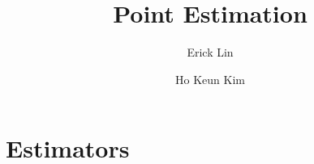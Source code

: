 \documentclass[a4paper,12pt]{article}
\title{Point Estimation}
\author{Erick Lin \and Ho Keun Kim}
\theoremstyle{definition}
\newtheorem{theorem}{Theorem}[section]
\theoremstyle{definition}
\theoremstyle{definition}
\begin{document}
\maketitle

\section{Estimators}
    \iffalse
    \begin{theorem}[Markov's inequality]
        If $X$ is a nonnegative random variable, then
        \begin{align*}
            \mathbb{P}(X \geq x) \leq \frac{\mathbb{E}(X)}{x}, x > 0.
        \end{align*}
    \end{theorem}
     For $x > 0$, $x \mathds{X \geq x} \leq X$. Taking expected values, $x \mathbb{P}(X \geq x) \leq \mathbb{E}(X)$.
    \fi
\end{document}
